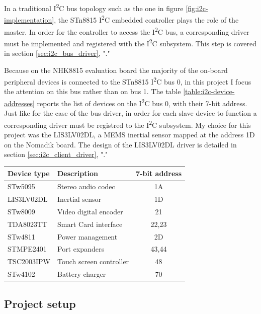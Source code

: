 \documentclass[a4paper,10pt]{article}
\makeatletter
\newenvironment{tablehere}{\def\@captype{table}}{}
\newcommand{\icc}{I\textsuperscript{2}C }
\makeatother
\begin{document}
\begin{multicols}{2}
In a traditional \icc bus topology such as the one in figure
\ref{fig:i2c-implementation}, the STn8815 \icc embedded controller plays the
role of the master. In order for the controller to access the \icc bus, a
corresponding driver must be implemented and registered with the \icc
subsystem. This step is covered in section \ref{sec:i2c_bus_driver},
"."

Because on the NHK8815 evaluation board the majority of the on-board peripheral
devices is connected to the STn8815 \icc bus 0, in this project I focus the
attention on this bus rather than on bus 1.
The table \ref{table:i2c-device-addresses} reports the list of devices on 
the \icc bus 0, with their 7-bit address.
Just like for the case of the bus driver, in order for each slave device
to function a corresponding driver must be registred to the \icc subsystem.
My choice for this project was the LIS3LV02DL, a MEMS inertial sensor mapped
at the address 1D on the Nomadik board.
The design of the LIS3LV02DL driver is detailed in section
\ref{sec:i2c_client_driver}, "."\\[6pt]

\begin{tablehere}
	\centering
	\renewcommand{\arraystretch}{1.2}	
	\begin{tabular}{l l c}
		\hline
		Device type & Description & 7-bit address \\
		\hline
		STw5095 & Stereo audio codec & 1A \\
		LIS3LV02DL & Inertial sensor & 1D \\
		STw8009 & Video digital encoder	 & 21 \\
		TDA8023TT & Smart Card interface & 22,23 \\
		STw4811 & Power management & 2D \\
		STMPE2401 & Port expanders & 43,44 \\
		TSC2003IPW & Touch screen controller & 48 \\
		STw4102 & Battery charger & 70 \\
		\hline
	\end{tabular}
	\caption{NHK8815 \icc device address map.}
	\label{table:i2c-device-addresses}
\end{tablehere}



\subsection{Project setup}
\label{sec:project_setup}


\end{multicols}
\end{document}
